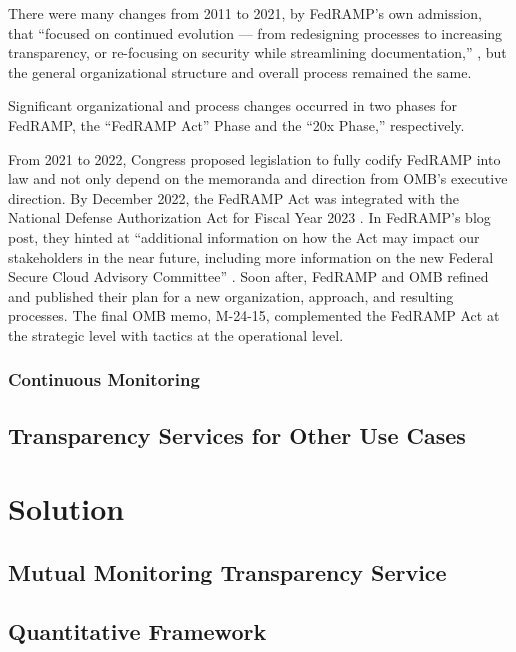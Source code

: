 \documentclass{jdf}
\begin{document}
There were many changes from 2011 to 2021, by FedRAMP's own admission, that ``focused on continued evolution — from redesigning processes to increasing transparency, or re-focusing on security while streamlining documentation,'' \citeyear{fedramp_blog_retrospective21}, but the general organizational structure and overall process remained the same.


Significant organizational and process changes occurred in two phases for FedRAMP, the ``FedRAMP Act'' Phase and the ``20x Phase,'' respectively.

From 2021 to 2022, Congress proposed legislation to fully codify FedRAMP into law and not only depend on the memoranda and direction from OMB's executive direction. By December 2022, the FedRAMP Act was integrated with the National Defense Authorization Act for Fiscal Year 2023 \cite{ndaa2023}. In FedRAMP's blog post, they hinted at ``additional information on how the Act may impact our stakeholders in the near future, including more information on the new Federal Secure Cloud Advisory Committee'' \citeyear{fedramp_blog_ndaa2023}. Soon after, FedRAMP and OMB refined and published their plan for a new organization, approach, and resulting processes. The final OMB memo, M-24-15, complemented the FedRAMP Act at the strategic level with tactics at the operational level. 

\subsubsection{Continuous Monitoring}

\subsection{Transparency Services for Other Use Cases}

\section{Solution}

\subsection{Mutual Monitoring Transparency Service}

\subsection{Quantitative Framework}
\end{document}
